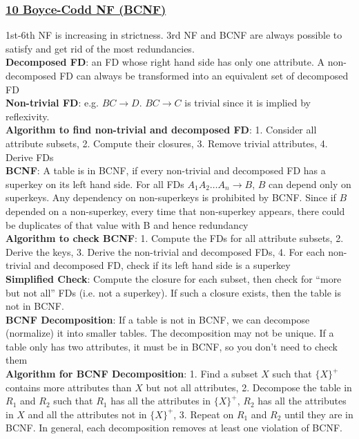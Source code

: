 \documentclass{article}
\begin{document}
{\begin{multicols*}{3}
\subsubsection*{\underline{10 Boyce-Codd NF (BCNF)}}
1st-6th NF is increasing in strictness. 3rd NF and BCNF are always possible to satisfy and get rid of the most redundancies. \\
\textbf{Decomposed FD}: an FD whose right hand side has only one attribute. A non-decomposed FD can always be transformed into an equivalent set of decomposed FD\\
\textbf{Non-trivial FD}: e.g. $BC\to D$. $BC\to C$ is trivial since it is implied by reflexivity. \\
\textbf{Algorithm to find non-trivial and decomposed FD}: 1. Consider all attribute subsets, 2. Compute their closures, 3. Remove trivial attributes, 4. Derive FDs  \\
\textbf{BCNF}: A table is in BCNF, if every non-trivial and decomposed FD has a superkey on its left hand side. For all FDs $A_1A_2\dots A_n\to B$, $B$ can depend only on superkeys. Any dependency on non-superkeys is prohibited by BCNF. Since if $B$ depended on a non-superkey, every time that non-superkey appears, there could be duplicates of that value with B and hence redundancy \\
\textbf{Algorithm to check BCNF}: 1. Compute the FDs for all attribute subsets, 2. Derive the keys, 3. Derive the non-trivial and decomposed FDs, 4. For each non-trivial and decomposed FD, check if its left hand side is a superkey\\
\textbf{Simplified Check}: Compute the closure for each subset, then check for ``more but not all'' FDs (i.e. not a superkey). If such a closure exists, then the table is not in BCNF. \\
\textbf{BCNF Decomposition}: If a table is not in BCNF, we can decompose (normalize) it into smaller tables. The decomposition may not be unique. If a table only has two attributes, it must be in BCNF, so you don't need to check them \\
\textbf{Algorithm for BCNF Decomposition}: 1. Find a subset $X$ such that $\{X\}^+$ contains more attributes than $X$ but not all attributes, 2. Decompose the table in $R_1$ and $R_2$ such that $R_1$ has all the attributes in $\{X\}^+$, $R_2$ has all the attributes in $X$ and all the attributes not in $\{X\}^+$, 3. Repeat on $R_1$ and $R_2$ until they are in BCNF. In general, each decomposition removes at least one violation of BCNF. \\ 

\end{multicols*}}
\end{document}
